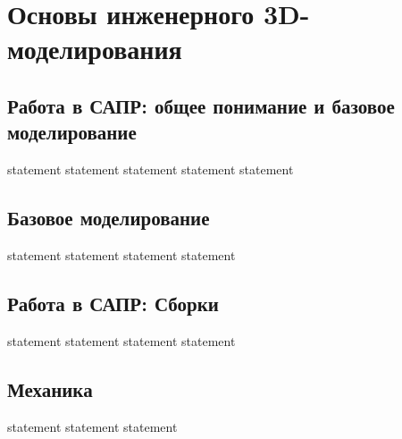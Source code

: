 \chapter{Основы инженерного 3D-моделирования}

\section{Работа в САПР: общее понимание и базовое моделирование}

{statement}
{statement}
{statement}
{statement}
{statement}

\section{Базовое моделирование}

{statement}
{statement}
{statement}
{statement}

\section{Работа в САПР: Сборки}

{statement}
{statement}
{statement}
{statement}

\section{Механика}

{statement}
{statement}
{statement}
